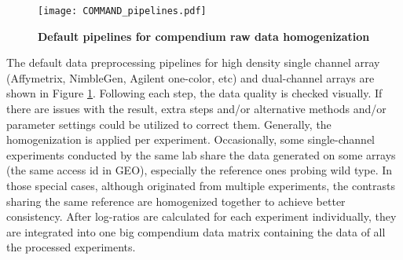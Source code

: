 \begin{figure}
  \centering
  \texttt{[image: COMMAND\_pipelines.pdf]}
  \caption[Default pipelines for compendium raw data homogenization]{
    \textbf{Default pipelines for compendium raw data homogenization}}
  \label{fig:command-pipelines}
\end{figure}
%

The default data preprocessing pipelines for high density single channel array 
(Affymetrix, NimbleGen, Agilent one-color, etc) and dual-channel arrays are 
shown in Figure \ref{fig:command-pipelines}.
%
%
Following each step, the data quality is checked visually.  If there are issues
with the result, extra steps and/or alternative methods and/or parameter
settings could be utilized to correct them.
%
%
Generally, the homogenization is applied per experiment.  
%
Occasionally, some single-channel experiments conducted by the same lab share
the data generated on some arrays (the same access id in GEO), especially the
reference ones probing wild type.
%
%
In those special cases, although originated from multiple experiments,
the contrasts sharing the same reference are homogenized together to
achieve better consistency.
%
After log-ratios are calculated for each experiment individually, they are
integrated into one big compendium data matrix containing the data of all the
processed experiments.

